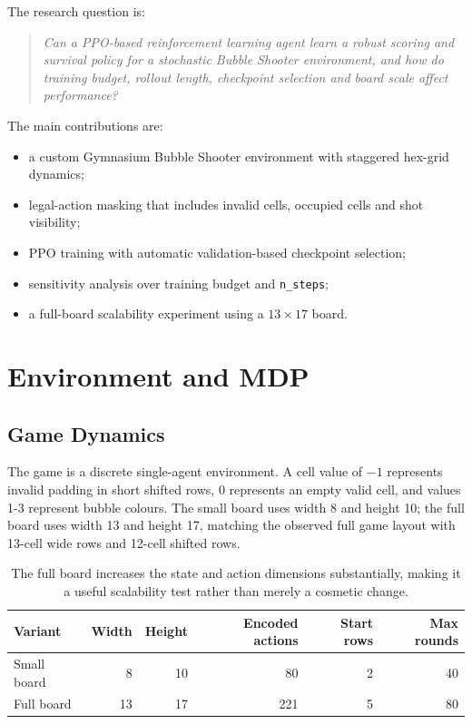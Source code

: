 \documentclass[10pt,a4paper]{article}
\begin{document}
The research question is:
\begin{quote}
\textit{Can a PPO-based reinforcement learning agent learn a robust scoring and survival policy for a stochastic Bubble Shooter environment, and how do training budget, rollout length, checkpoint selection and board scale affect performance?}
\end{quote}

The main contributions are:
\begin{itemize}
    \item a custom Gymnasium Bubble Shooter environment with staggered hex-grid dynamics;
    \item legal-action masking that includes invalid cells, occupied cells and shot visibility;
    \item PPO training with automatic validation-based checkpoint selection;
    \item sensitivity analysis over training budget and \texttt{n\_steps};
    \item a full-board scalability experiment using a \(13\times17\) board.
\end{itemize}

\section{Environment and MDP}

\subsection{Game Dynamics}

The game is a discrete single-agent environment. A cell value of \(-1\) represents invalid padding in short shifted rows, 0 represents an empty valid cell, and values 1-3 represent bubble colours. The small board uses width 8 and height 10; the full board uses width 13 and height 17, matching the observed full game layout with 13-cell wide rows and 12-cell shifted rows.

\begin{table}[H]
\centering
\caption{The full board increases the state and action dimensions substantially, making it a useful scalability test rather than merely a cosmetic change.}
\label{tab:board-variants}
\small
\begin{tabular}{lrrrrr}
\toprule
Variant & Width & Height & Encoded actions & Start rows & Max rounds \\
\midrule
Small board & 8 & 10 & 80 & 2 & 40 \\
Full board & 13 & 17 & 221 & 5 & 80 \\
\bottomrule
\end{tabular}
\end{table}
\end{document}

